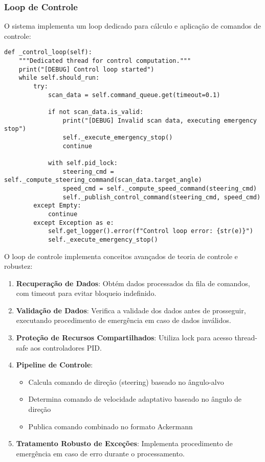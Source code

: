 \subsubsection{Loop de Controle}

O sistema implementa um loop dedicado para cálculo e aplicação de comandos de
controle:

\begin{verbatim}
def _control_loop(self):
    """Dedicated thread for control computation."""
    print("[DEBUG] Control loop started")
    while self.should_run:
        try:
            scan_data = self.command_queue.get(timeout=0.1)
            
            if not scan_data.is_valid:
                print("[DEBUG] Invalid scan data, executing emergency stop")
                self._execute_emergency_stop()
                continue
            
            with self.pid_lock:
                steering_cmd = self._compute_steering_command(scan_data.target_angle)
                speed_cmd = self._compute_speed_command(steering_cmd)
                self._publish_control_command(steering_cmd, speed_cmd)
        except Empty:
            continue
        except Exception as e:
            self.get_logger().error(f"Control loop error: {str(e)}")
            self._execute_emergency_stop()
\end{verbatim}

O loop de controle implementa conceitos avançados de teoria de controle e
robustez:

\begin{enumerate}
    \item \textbf{Recuperação de Dados}: Obtém dados processados da fila de comandos, com timeout para evitar bloqueio indefinido.

    \item \textbf{Validação de Dados}: Verifica a validade dos dados antes de prosseguir, executando procedimento de emergência em caso de dados inválidos.

    \item \textbf{Proteção de Recursos Compartilhados}: Utiliza lock para acesso thread-safe aos controladores PID.

    \item \textbf{Pipeline de Controle}:
          \begin{itemize}
              \item Calcula comando de direção (steering) baseado no ângulo-alvo
              \item Determina comando de velocidade adaptativo baseado no ângulo de direção
              \item Publica comando combinado no formato Ackermann
          \end{itemize}

    \item \textbf{Tratamento Robusto de Exceções}: Implementa procedimento de emergência em caso de erro durante o processamento.
\end{enumerate}

